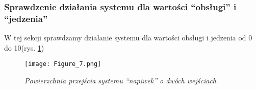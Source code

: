 \subsubsection{Sprawdzenie działania systemu dla wartości ``obsługi'' i ``jedzenia''}\label{ssc:sprawdzenie_dzialania_obsluga_jedzenie}

W tej sekcji sprawdzamy działanie systemu dla wartości obsługi i jedzenia od 0 do 10(rys. \ref{fig:napiwek_obsluga_jedzenie})



\begin{figure}[h]
	\centering
	\texttt{[image: Figure\_7.png]}
	\caption{\textit{Powierzchnia przejścia systemu ``napiwek'' o dwóch wejściach}}
	\label{fig:napiwek_obsluga_jedzenie}
\end{figure}
